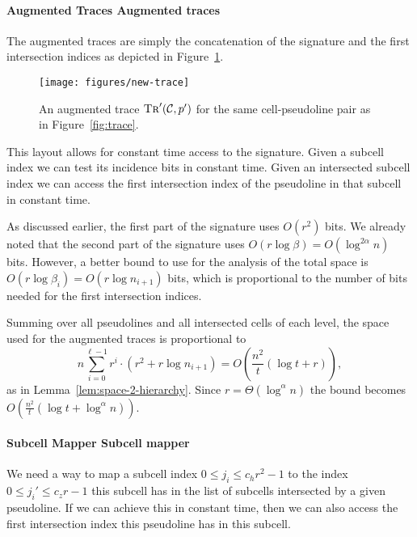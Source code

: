 \paragraph*{\iftitlecase%
Augmented Traces\else%
Augmented traces\fi}

The augmented traces are simply the concatenation of the signature and the
first intersection indices as depicted in Figure~\ref{fig:new-trace}.
%
\begin{figure}
  \centering{}
  \texttt{[image: figures/new-trace]}
  \caption{%
	  An augmented trace \(\textsc{Tr}'(\mathcal{C}, p')\)
      for the same cell-pseudoline pair as in Figure~\ref{fig:trace}.
  }\label{fig:new-trace}
\end{figure}
%
This layout allows for constant time access to the signature.
Given a subcell index we can test its incidence bits in constant time.
Given an intersected subcell index we can access the first intersection index
of the pseudoline in that subcell in constant time.

As discussed earlier, the first part of the signature uses \(O(r^2)\) bits.
We already noted that the second part of the signature
uses \(O(r \log \beta) = O(\log^{2 \alpha} n)\) bits. However, a better bound
to use for the analysis of the total space is
\(O(r \log \beta_i) = O(r \log n_{i+1})\) bits, which is proportional to the
number of bits needed for the first intersection indices.

Summing over all pseudolines and all intersected cells of each level,
the space used for the augmented traces is proportional to
\begin{displaymath}
n \sum_{i=0}^{\ell-1} r^i \cdot \left( r^2 + r \log n_{i+1} \right)
=
O\left(\frac{n^2}{t} (\log t + r)\right),
\end{displaymath}
%
as in Lemma~\ref{lem:space-2-hierarchy}.
Since \(r = \Theta(\log^{\alpha} n)\) the bound becomes
\(O\left(\frac{n^2}{t} (\log t + \log^{\alpha} n)\right)\).


\paragraph*{\iftitlecase%
Subcell Mapper\else%
Subcell mapper\fi}

We need a way to map a subcell index \(0 \leq j_i \leq c_h r^2 - 1\) to the
index \(0 \leq j_i' \leq c_z r - 1\) this subcell has in the list of subcells
intersected by a given pseudoline. If we can achieve this in constant time,
then we can also access the first intersection index this pseudoline has in
this subcell.

